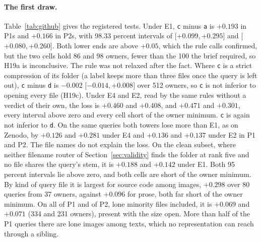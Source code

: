 \documentclass[11pt]{article}
\newcommand{\rep}[1]{\texttt{#1}}
\newcommand{\ci}[2]{[\ensuremath{#1},\,\ensuremath{#2}]}  %
\begin{document}
\paragraph{The first draw.} Table~\ref{tab:github} gives the registered tests. Under E1, \rep{c} minus \rep{a} is $+0.193$ in P1s and $+0.166$ in P2s, with 98.33 percent intervals of \ci{+0.099}{+0.295} and \ci{+0.080}{+0.260}. Both lower ends are above $+0.05$, which the rule calls confirmed, but the two cells hold 86 and 98 owners, fewer than the 100 the brief required, so H19a is inconclusive. The rule was not relaxed after the fact. Where \rep{c} is a strict compression of its folder (a label keeps more than three files once the query is left out), \rep{c} minus \rep{d} is $-0.002$ \ci{-0.014}{+0.008} over 512 owners, so \rep{c} is not inferior to opening every file (H19c). Under E4 and E2, read by the same rules without a verdict of their own, the loss is $+0.460$ and $+0.408$, and $+0.471$ and $+0.301$, every interval above zero and every cell short of the owner minimum. \rep{c} is again not inferior to \rep{d}. On the same queries both towers lose more than E1, as on Zenodo, by $+0.126$ and $+0.281$ under E4 and $+0.136$ and $+0.137$ under E2 in P1 and P2. The file names do not explain the loss. On the clean subset, where neither filename router of Section~\ref{sec:validity} finds the folder at rank five and no file shares the query's stem, it is $+0.188$ and $+0.142$ under E1. Both 95 percent intervals lie above zero, and both cells are short of the owner minimum. By kind of query file it is largest for source code among images, $+0.298$ over 80 queries from 37 owners, against $+0.096$ for prose, both far short of the owner minimum. On all of P1 and of P2, lone minority files included, it is $+0.069$ and $+0.071$ (334 and 231 owners), present with the size open. More than half of the P1 queries there are lone images among texts, which no representation can reach through a sibling.
\end{document}
